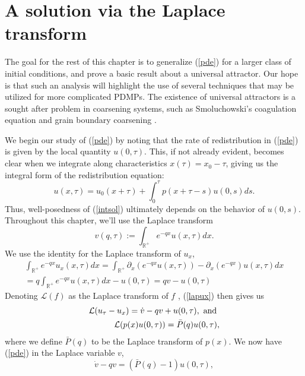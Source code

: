 \section{A solution via the Laplace transform}\label{lapsection}

The goal for the rest of this chapter is to generalize (\ref{pde}) for a larger class of initial conditions, and prove a basic result about a universal attractor.  Our hope is that such an analysis will highlight the use of several techniques that may be utilized for more complicated PDMPs. The existence of universal attractors is a sought after problem in coarsening systems, such as Smoluchowski's coagulation equation \cite{menon2004approach} and grain boundary coarsening \cite{her12}. 

We begin our study of (\ref{pde}) by noting that the rate of redistribution in (\ref{pde}) is given by the local quantity $u(0,\tau)$.  This, if not already evident, becomes clear when we integrate along characteristics $x(\tau) = x_0-\tau$, giving us the integral form of the redistribution equation:
\begin{equation}\label{intsol}
u(x,\tau) = u_0(x+\tau) +\int_0^\tau p(x+\tau-s)u(0,s)ds. 
\end{equation}
Thus, well-posedness of (\ref{intsol}) ultimately depends on the behavior of $u(0,s)$.
Throughout this chapter, we'll use the Laplace transform  
\begin{equation} v(q,\tau) := \int_{\mathbb{R^+}}e^{-qx}u(x,\tau)dx. 
\end{equation}
We use the identity for the Laplace transform of $u_x$,  
\begin{eqnarray}\label{lapux}
\int_{\mathbb{R^+}}e^{-qx}u_x(x,\tau)dx = \int_{\mathbb{R^+}}\partial_x(e^{-qx}u(x,\tau))-\partial_x(e^{-qx})u(x,\tau)dx\\
 = q\int_{\mathbb{R^+}}e^{-qx}u(x,\tau)dx - u(0,\tau) = qv-u(0,\tau) \nonumber 
 \end{eqnarray}
 Denoting $\mathcal L(f)$ as the Laplace transform of  $f$ ,  (\ref{lapux}) then gives us
\begin{align*}
\mathcal{L}(u_\tau-u_x) = \dot v-qv+u(0,\tau), \hbox{ and }   \\
\mathcal L(p(x)u(0,\tau)) = \bar P(q)u(0,\tau),
\end{align*}
where we define $ \bar P(q)$ to be the Laplace transform of $p(x)$.  We now have (\ref{pde}) in the Laplace variable $v$,
\begin{equation}
\dot v -qv = (\bar P(q)-1)u(0,\tau),
\end{equation}
